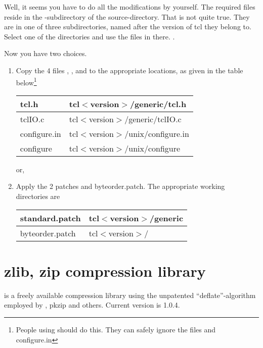 Well, it seems you have to do all the modifications by yourself. The
required files reside in the -subdirectory of the
source-directory. That is not quite true. They are in one of three
subdirectories, named after the version of tcl they belong to. Select
one of the directories and use the files in there. .

Now you have two choices.

\begin {enumerate}
\item	Copy the 4 files , , 
	and  to the appropriate locations, as given
	in the table below\footnote {People using \win{} should do
	this. They can safely ignore the files  and \file
	{configure.in}} 

	\begin {tabular} {|l|l|} \hline
	tcl.h		& tcl$<$version$>$/generic/tcl.h	\\ \hline
	tclIO.c		& tcl$<$version$>$/generic/tclIO.c	\\ \hline
	configure.in	& tcl$<$version$>$/unix/configure.in	\\ \hline
	configure	& tcl$<$version$>$/unix/configure	\\ \hline
	\end {tabular}

	or,

\item	Apply the 2 patches  and \file
	{byteorder.patch}. The appropriate working directories are

	\begin {tabular} {|l|l|} \hline
	standard.patch	& tcl$<$version$>$/generic	\\ \hline
	byteorder.patch	& tcl$<$version$>$/		\\ \hline
	\end {tabular}
\end   {enumerate}


\chapter {zlib, zip compression library}\label{zlib}

 is a freely available compression library using the
unpatented ``deflate''-algorithm employed by , \cmd
{pkzip} and others. Current version is 1.0.4.

